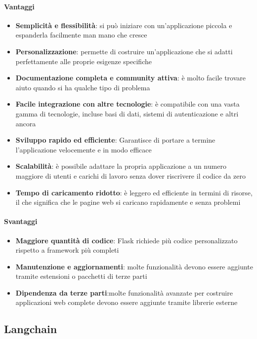 \documentclass{article}
\begin{document}
\paragraph*{Vantaggi}
\begin{itemize}
    \item \textbf{Semplicità e flessibilità}: si può iniziare con 
    un’applicazione piccola e espanderla facilmente man mano che cresce
    \item \textbf{Personalizzazione}: permette di costruire 
    un’applicazione che si adatti perfettamente alle proprie esigenze 
    specifiche
    \item \textbf{Documentazione completa e community attiva}: è molto 
    facile trovare aiuto quando si ha qualche tipo di problema
    \item \textbf{Facile integrazione con altre tecnologie}: è 
    compatibile con una vasta gamma di tecnologie, incluse basi di dati, 
    sistemi di autenticazione e altri ancora
    \item \textbf{Sviluppo rapido ed efficiente}: Garantisce di portare 
    a termine l’applicazione velocemente e in modo efficace
    \item \textbf{Scalabilità}: è possibile adattare la propria 
    applicazione a un numero maggiore di utenti e carichi di lavoro 
    senza dover riscrivere il codice da zero
    \item \textbf{Tempo di caricamento ridotto}: è leggero ed efficiente 
    in termini di risorse, il che significa che le pagine web si 
    caricano rapidamente e senza problemi
\end{itemize}
\paragraph*{Svantaggi}
\begin{itemize}
    \item \textbf{Maggiore quantità di codice}: Flask richiede più 
    codice personalizzato rispetto a framework più completi
    \item \textbf{Manutenzione e aggiornamenti}:  molte funzionalità 
    devono essere aggiunte tramite estensioni o pacchetti di terze parti
    \item \textbf{Dipendenza da terze parti}:molte funzionalità 
    avanzate per costruire applicazioni web complete devono essere 
    aggiunte tramite librerie esterne
\end{itemize}

\subsection{Langchain}
\end{document}

